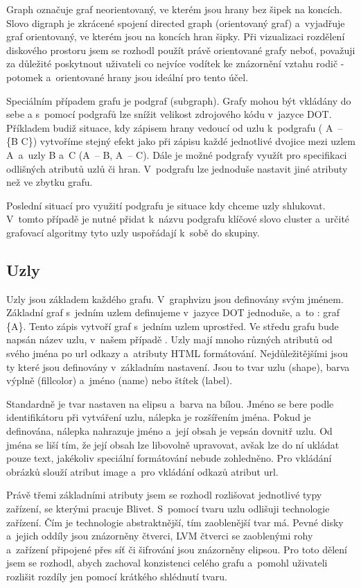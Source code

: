 \documentclass[color,table,oneside,nolot,nolof]{fithesis}
\begin{document}
	Graph označuje graf neorientovaný, ve kterém jsou hrany bez šipek na koncích. Slovo digraph je zkrácené spojení directed graph (orientovaný
	graf) a~vyjadřuje graf orientovaný, ve kterém jsou na koncích hran šipky. Při vizualizaci rozdělení diskového prostoru jsem se rozhodl použít právě orientované grafy neboť, považuji za 
	důležité poskytnout uživateli co nejvíce vodítek ke znázornění vztahu rodič - potomek a~orientované hrany jsou ideální pro tento účel. 

	Speciálním případem grafu je podgraf (subgraph). Grafy mohou být vkládány do sebe a s~pomocí podgrafů lze snížit velikost zdrojového kódu v~jazyce DOT. Příkladem budiž situace, kdy zápisem
	hrany vedoucí od uzlu k~podgrafu ( A~-- \{B C\}) vytvoříme stejný efekt jako při zápisu každé jednotlivé dvojice mezi uzlem A~a~uzly B a~C (A~-- B, A~-- C). Dále je možné podgrafy využít
	pro specifikaci odlišných atributů uzlů či hran. V~podgrafu lze jednoduše nastavit jiné atributy než ve zbytku grafu.

	Poslední situací pro využití podgrafu je situace kdy chceme uzly shlukovat. V~tomto případě je nutné přidat k~názvu podgrafu klíčové slovo cluster a~určité grafovací algoritmy tyto uzly 
	uspořádají k~sobě do skupiny.

\subsection{Uzly}
	Uzly jsou základem každého grafu. V~graphvizu jsou definovány svým jménem. Základní graf s~jedním uzlem definujeme v~jazyce DOT jednoduše, a~to : graf \{A\}. Tento zápis vytvoří
	graf s~jedním uzlem uprostřed. Ve středu grafu bude napsán název uzlu, v~našem případě . Uzly mají mnoho různých atributů od svého jména po url odkazy a~atributy HTML formátování. 
	Nejdůležitějšími jsou ty které jsou definovány v~základním nastavení. Jsou to tvar uzlu (shape), barva výplně (fillcolor) a~jméno (name) nebo štítek (label). 
	
	Standardně je tvar nastaven na elipsu a~barva
	na bílou. Jméno se bere podle identifikátoru při vytváření uzlu, nálepka je rozšířením jména. Pokud je definována, nálepka nahrazuje jméno a~její obsah je vepsán dovnitř uzlu. Od jména se liší 
	tím, že její obsah lze libovolně upravovat, avšak lze do ní ukládat pouze text, jakékoliv speciální formátování nebude zohledněno. Pro vkládání obrázků slouží atribut image a~pro vkládání
	odkazů atribut url.

	Právě třemi základními atributy jsem se rozhodl rozlišovat jednotlivé typy zařízení, se kterými pracuje Blivet. S~pomocí tvaru uzlu odlišuji technologie zařízení. Čím je technologie
	abstraktnější, tím zaoblenější tvar má. Pevné disky a~jejich oddíly jsou znázorněny čtverci, LVM čtverci se zaoblenými rohy a~zařízení připojené přes síť či šifrování jsou znázorněny elipsou.
	Pro toto dělení jsem se rozhodl, abych zachoval konzistenci celého grafu a~pomohl uživateli rozlišit rozdíly jen pomocí krátkého shlédnutí tvaru.
\end{document}
